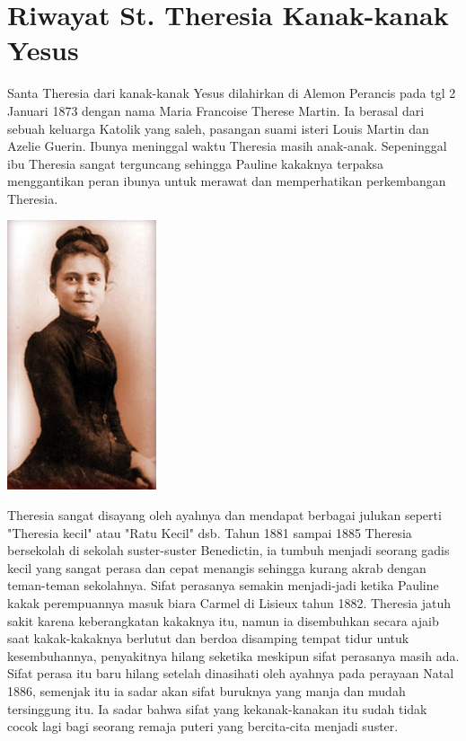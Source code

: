 \section{Riwayat St. Theresia Kanak-kanak Yesus}
Santa Theresia dari kanak-kanak Yesus dilahirkan di Alemon Perancis pada tgl 2 Januari 1873 dengan nama Maria Francoise Therese Martin. Ia berasal dari sebuah keluarga Katolik yang saleh, pasangan suami isteri Louis Martin dan Azelie Guerin. Ibunya meninggal waktu Theresia masih anak-anak. Sepeninggal ibu Theresia sangat terguncang sehingga Pauline kakaknya terpaksa menggantikan peran ibunya untuk merawat dan memperhatikan perkembangan Theresia.

\begin{floatingfigure}[l]{2.75cm}
\begin{center}
\includegraphics[scale=0.5]{theresia-1.jpg}
\end{center}
\end{floatingfigure}
Theresia sangat disayang oleh ayahnya dan mendapat berbagai julukan seperti "Theresia kecil" atau "Ratu Kecil" dsb. Tahun 1881 sampai 1885 Theresia bersekolah di sekolah suster-suster Benedictin, ia tumbuh menjadi seorang gadis kecil yang sangat perasa dan cepat menangis sehingga kurang akrab dengan teman-teman sekolahnya. Sifat perasanya semakin menjadi-jadi ketika Pauline kakak perempuannya masuk biara Carmel di Lisieux tahun 1882. Theresia jatuh sakit karena keberangkatan kakaknya itu, namun ia disembuhkan secara ajaib saat kakak-kakaknya berlutut dan berdoa disamping tempat tidur untuk kesembuhannya, penyakitnya hilang seketika meskipun sifat perasanya masih ada. Sifat perasa itu baru hilang setelah dinasihati oleh ayahnya pada perayaan Natal 1886, semenjak itu ia sadar akan sifat buruknya yang manja dan mudah tersinggung itu. Ia sadar bahwa sifat yang kekanak-kanakan itu sudah tidak cocok lagi bagi seorang remaja puteri yang bercita-cita menjadi suster.

